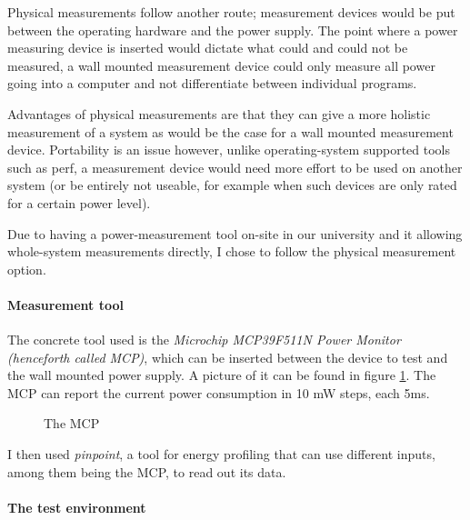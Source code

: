 Physical measurements follow another route; measurement devices would be put between the operating hardware and the power supply. The point where a power measuring device is inserted would dictate what could and could not be measured, a wall mounted measurement device could only measure all power going into a computer and not differentiate between individual programs.

Advantages of physical measurements are that they can give a more holistic measurement of a system as would be the case for a wall mounted measurement device. Portability is an issue however, unlike operating-system supported tools such as perf, a measurement device would need more effort to be used on another system (or be entirely not useable, for example when such devices are only rated for a certain power level).

Due to having a power-measurement tool on-site in our university and it allowing whole-system measurements directly, I chose to follow the physical measurement option. 

\paragraph{Measurement tool}

The concrete tool used is the \emph{Microchip MCP39F511N Power Monitor (henceforth called MCP)}, which can be inserted between the device to test and the wall mounted power supply. A picture of it can be found in figure \ref{fig:mcp}. The MCP can report the current power consumption in 10 mW steps, each 5ms.

\begin{figure}
    \caption[short]{The MCP}
    \label{fig:mcp}
\end{figure}


I then used \emph{pinpoint}, a tool for energy profiling that can use different inputs, among them being the MCP, to read out its data. 

\paragraph{The test environment}

